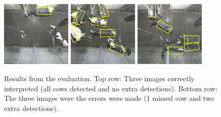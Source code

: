 \documentclass[10pt,a4paper,twocolumn]{article}
\begin{document}
\begin{figure}[tb]
\begin{center}
  \includegraphics[width=0.3\textwidth]{bad/1419743355933936.jpg}
  \includegraphics[width=0.3\textwidth]{bad/1420050868326145.jpg}
  \includegraphics[width=0.3\textwidth]{bad/1420185482574217.jpg}
\end{center}
  \caption{Results from the evaluation. Top row: Three images correctly interpreted (all cows detected and no extra detections). Bottom row: The three images were the errors were made (1 missed cow and two extra detections).}
  \label{fig:res}
\end{figure}
\end{document}
